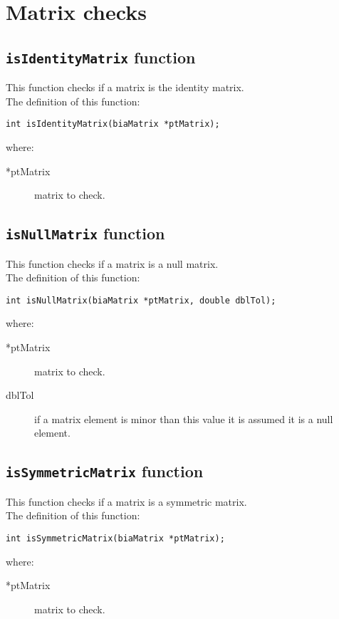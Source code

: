 \section{Matrix checks}

\subsection{\texttt{isIdentityMatrix} function}

This function checks if a matrix is the identity matrix.\\
%
The definition of this function:
%
\begin{verbatim}
int isIdentityMatrix(biaMatrix *ptMatrix);
\end{verbatim}
%
where:
%
\begin{description}
\item[*ptMatrix] matrix to check.
\end{description}
%

\subsection{\texttt{isNullMatrix} function}

This function checks if a matrix is a null matrix.\\
%
The definition of this function:
%
\begin{verbatim}
int isNullMatrix(biaMatrix *ptMatrix, double dblTol);
\end{verbatim}
%
where:
%
\begin{description}
\item[*ptMatrix] matrix to check.
\item[dblTol] if a matrix element is minor than this value it is assumed it is a null element.
\end{description}
%

\subsection{\texttt{isSymmetricMatrix} function}

This function checks if a matrix is a symmetric matrix.\\
%
The definition of this function:
%
\begin{verbatim}
int isSymmetricMatrix(biaMatrix *ptMatrix);
\end{verbatim}
%
where:
%
\begin{description}
\item[*ptMatrix] matrix to check.
\end{description}
%
